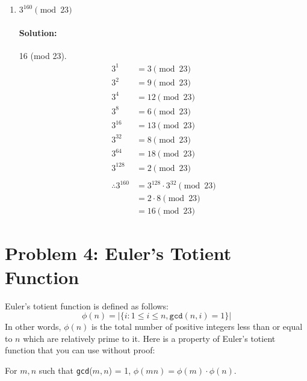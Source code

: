 \documentclass[11pt, notitlepage]{report}
\newcommand{\Question}[1]{\newpage\section{#1}}
\newenvironment{solution}{\paragraph{Solution:}}{\hfill}
\begin{document}
\begin{enumerate}[label=(\alph*)]
\item $3^{160} \pmod {23}$
\begin{solution} 16 (mod 23).
	\begin{align*}
		3^1&=3 \pmod{23} \\
		3^2&=9 \pmod{23} \\
		3^4&=12 \pmod{23} \\
		3^8&=6 \pmod{23} \\
		3^{16}&=13 \pmod{23} \\
		3^{32}&=8 \pmod{23} \\
		3^{64}&=18 \pmod{23} \\
		3^{128}&=2 \pmod{23} \\
		&\\
		\therefore 3^{160}&=3^{128}\cdot3^{32}\pmod{23} \\
		&= 2\cdot 8 \pmod{23} \\
		&= 16 \pmod{23}
	\end{align*}

\end{solution}
\end{enumerate}

\Question{Problem 4: Euler's Totient Function}

  Euler's totient function is defined as follows:
  $$\phi(n) = | \{i: 1 \leq i \leq n, \texttt{gcd}(n,i) = 1\} |$$
  In other words, $\phi(n)$ is the total number of positive integers less than or equal to $n$ which are relatively prime to it.
  Here is a property of Euler's totient function that you can use without proof:

  For $m,n$ such that \texttt{gcd}($m,n$) = 1, $\phi(mn) = \phi(m) \cdot \phi(n)$.
\end{document}
